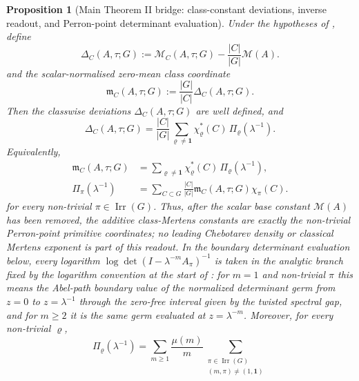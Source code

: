 \documentclass[11pt,a4paper]{amsart}
\theoremstyle{plain}
\newtheorem{proposition}[theorem]{Proposition}
\theoremstyle{definition}
\theoremstyle{remark}
\DeclareMathOperator{\Irr}{Irr}
\begin{document}
\begin{proposition}[Main Theorem II bridge: class-constant deviations,
  inverse readout, and Perron-point determinant evaluation]
  \label{prop:class-mertens-deviations}
  Under the hypotheses of , define
  \[
    \Delta_C(A,\tau;G)
    :=\mathcal M_C(A,\tau;G)-\frac{|C|}{|G|}\mathcal M(A).
  \]
  and the scalar-normalised zero-mean class coordinate
  \[
    \mathfrak m_C(A,\tau;G)
    :=\frac{|G|}{|C|}\Delta_C(A,\tau;G).
  \]
  Then the classwise deviations \(\Delta_C(A,\tau;G)\) are well
  defined, and
  \begin{equation}\label{eq:class-mertens-fourier-expansion}
    \Delta_C(A,\tau;G)
    =
    \frac{|C|}{|G|}
      \sum_{\varrho\neq\mathbf 1}
        \chi_\varrho^\ast(C)\,\Pi_\varrho(\lambda^{-1}).
  \end{equation}
  Equivalently,
  \begin{equation}\label{eq:class-mertens-normalised-deviation-readout}
    \begin{aligned}
    \mathfrak m_C(A,\tau;G)
    &=
      \sum_{\varrho\neq\mathbf 1}
        \chi_\varrho^\ast(C)\,\Pi_\varrho(\lambda^{-1}),\\
    \Pi_\pi(\lambda^{-1})
    &=
      \sum_{C\subset G}\frac{|C|}{|G|}
        \mathfrak m_C(A,\tau;G)\chi_\pi(C).
    \end{aligned}
  \end{equation}
  for every non-trivial \(\pi\in\Irr(G)\). Thus, after the scalar base
  constant \(\mathcal M(A)\) has been removed, the additive class-Mertens
  constants are exactly the non-trivial Perron-point primitive coordinates;
  no leading Chebotarev density or classical Mertens exponent is part of this
  readout.
  In the boundary determinant evaluation below, every logarithm
  \(\log\det(I-\lambda^{-m}A_\pi)^{-1}\) is taken in the analytic
  branch fixed by the logarithm convention at the start of
  : for \(m=1\) and non-trivial \(\pi\) this
  means the Abel-path boundary value of the normalized determinant germ
  from \(z=0\) to \(z=\lambda^{-1}\) through the zero-free interval given by
  the twisted spectral gap, and for \(m\ge 2\) it is the same germ evaluated
  at \(z=\lambda^{-m}\).
  Moreover, for every non-trivial \(\varrho\),
  \begin{equation}\label{eq:class-mertens-determinant}
    \Pi_\varrho(\lambda^{-1})
    =
    \sum_{m\ge 1}\frac{\mu(m)}{m}
      \sum_{\substack{\pi\in\Irr(G)\\(m,\pi)\neq(1,\mathbf 1)}}

\end{equation}
\end{proposition}
\end{document}
